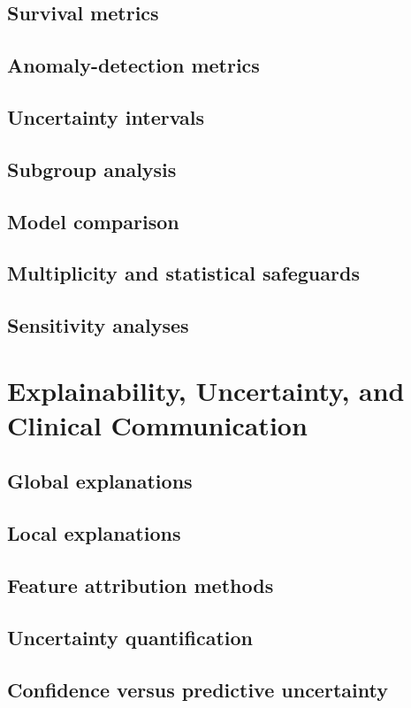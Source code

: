 \documentclass[11pt,journal,onecolumn,draftclsnofoot]{IEEEtran}
\begin{document}
\subsection{Survival metrics}
\subsection{Anomaly-detection metrics}
\subsection{Uncertainty intervals}
\subsection{Subgroup analysis}
\subsection{Model comparison}
\subsection{Multiplicity and statistical safeguards}
\subsection{Sensitivity analyses}

\section{Explainability, Uncertainty, and Clinical Communication}
\subsection{Global explanations}
\subsection{Local explanations}
\subsection{Feature attribution methods}
\subsection{Uncertainty quantification}
\subsection{Confidence versus predictive uncertainty}
\end{document}

